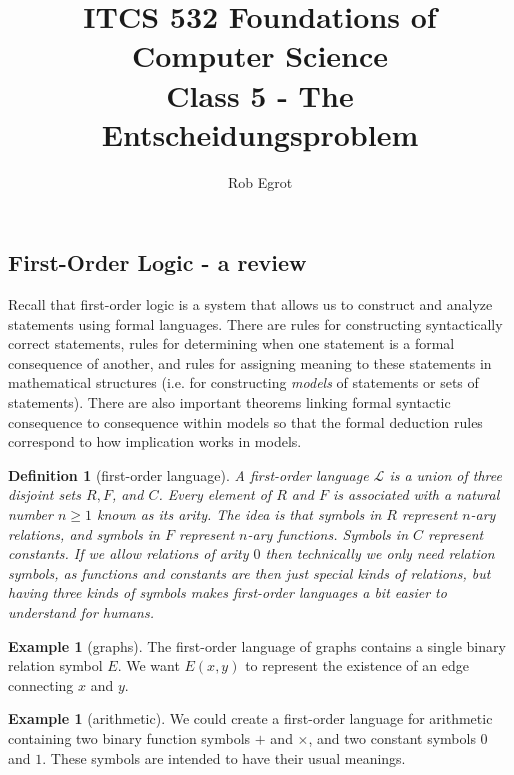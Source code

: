 \documentclass{article}
\title{ITCS 532 Foundations of Computer Science\\
Class 5 - The Entscheidungsproblem}
\author{Rob Egrot}
\date{}
\theoremstyle{plain}
\newtheorem{definition}[theorem]{Definition}{\bfseries}{\upshape}
\theoremstyle{definition}
\newtheorem{example}[theorem]{Example}{\bfseries}{\upshape}
\begin{document}
\maketitle


\subsection{First-Order Logic - a review}
Recall that first-order logic is a system that allows us to construct and analyze statements using formal languages. There are rules for constructing syntactically correct statements, rules for determining when one statement is a formal consequence of another, and rules for assigning meaning to these statements in mathematical structures (i.e. for constructing \emph{models} of statements or sets of statements). There are also important theorems linking formal syntactic consequence to consequence within models so that the formal deduction rules correspond to how implication works in models. 

\begin{definition}[first-order language]
A first-order language $\mathscr{L}$ is a union of three disjoint sets $R,F$, and $C$. Every element of $R$ and $F$ is associated with a natural number $n\geq 1$ known as its \emph{arity}. The idea is that symbols in $R$ represent $n$-ary relations, and symbols in $F$ represent $n$-ary functions. Symbols in $C$ represent constants. If we allow relations of arity $0$ then technically we only need relation symbols, as functions and constants are then just special kinds of relations, but having three kinds of symbols makes first-order languages a bit easier to understand for humans.
\end{definition} 

\begin{example}[graphs]
The first-order language of graphs contains a single binary relation symbol $E$. We want $E(x,y)$ to represent the existence of an edge connecting $x$ and $y$.
\end{example}

\begin{example}[arithmetic]
We could create a first-order language for arithmetic containing two binary function symbols $+$ and $\times$, and two constant symbols $0$ and $1$. These symbols are intended to have their usual meanings.
\end{example}
\end{document}
